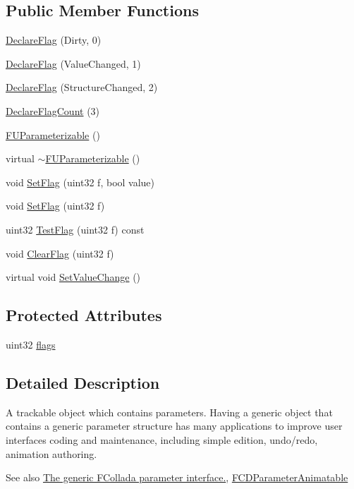\subsection*{Public Member Functions}
\begin{DoxyCompactItemize}
\item 
\hyperlink{classFUParameterizable_acbc2c8554d55dbe76840b83dfb934e7d}{DeclareFlag} (Dirty, 0)
\item 
\hyperlink{classFUParameterizable_ad99e1a6d6842acde6fe7383e84c5d5b1}{DeclareFlag} (ValueChanged, 1)
\item 
\hyperlink{classFUParameterizable_a7739aae88fcc7c5a30947bfa3cdc9119}{DeclareFlag} (StructureChanged, 2)
\item 
\hyperlink{classFUParameterizable_afde5b1719119e6759f4726f525021055}{DeclareFlagCount} (3)
\item 
\hyperlink{classFUParameterizable_a4be261cc6066a1bddbd1b45ba2bc29d5}{FUParameterizable} ()
\item 
virtual \hyperlink{classFUParameterizable_aab5030739efebfdf4fc901822432af2e}{$\sim$FUParameterizable} ()
\item 
void \hyperlink{classFUParameterizable_aec7ccfa808f8ec346c894172f5faabb9}{SetFlag} (uint32 f, bool value)
\item 
void \hyperlink{classFUParameterizable_ae8b93315f9374da6b2a6065f7e7edb1b}{SetFlag} (uint32 f)
\item 
uint32 \hyperlink{classFUParameterizable_a6487b738377a3d23ad7a171a96b7aeef}{TestFlag} (uint32 f) const 
\item 
void \hyperlink{classFUParameterizable_a09af3ed0cc0dd54daacf6bc6bf0ad93e}{ClearFlag} (uint32 f)
\item 
virtual void \hyperlink{classFUParameterizable_af6fbf123f3488d0af7607aae8241aaf8}{SetValueChange} ()
\end{DoxyCompactItemize}
\subsection*{Protected Attributes}
\begin{DoxyCompactItemize}
\item 
uint32 \hyperlink{classFUParameterizable_a572a6bd0f1948076600b6e352340fca5}{flags}
\end{DoxyCompactItemize}


\subsection{Detailed Description}
A trackable object which contains parameters. Having a generic object that contains a generic parameter structure has many applications to improve user interfaces coding and maintenance, including simple edition, undo/redo, animation authoring. \begin{DoxySeeAlso}{See also}
\hyperlink{group__FUParameter}{The generic FCollada parameter interface.}, \hyperlink{classFCDParameterAnimatable}{FCDParameterAnimatable} 
\end{DoxySeeAlso}


